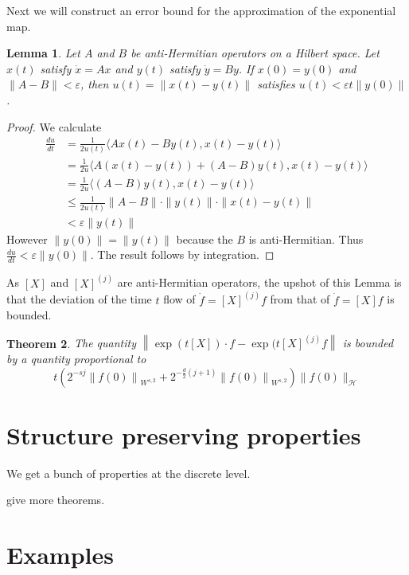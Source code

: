 \documentclass[12pt]{amsart}
\newcommand{\norm}[1]{\ensuremath{\left\| #1 \right\| }}
\newtheorem{thm}{Theorem}[section]
\newtheorem{lem}[thm]{Lemma}
\begin{document}
Next we will construct an error bound for the approximation of the exponential map.

\begin{lem}
Let $A$ and $B$ be anti-Hermitian operators on a Hilbert space.  Let $x(t)$ satisfy $\dot{x} = Ax$ and $y(t)$ satisfy $\dot{y} = By$.  If $x(0) = y(0)$ and $\| A - B \| < \varepsilon$, then $u(t) = \| x(t) - y(t) \|$ satisfies $u(t) < \varepsilon t  \| y(0) \|$.
\end{lem}

\begin{proof}
	We calculate
	\begin{align*}
		\frac{du}{dt} &= \frac{1}{2u(t)} \langle Ax(t) - By(t) , x(t) - y(t) \rangle \\
			&= \frac{1}{2u} \langle A(x(t)-y(t)) + (A-B) y(t) , x(t) - y(t) \rangle \\
			&= \frac{1}{2u} \langle (A-B)y(t) , x(t) - y(t) \rangle \\
			&\leq \frac{1}{2u(t)} \| A - B \| \cdot \| y(t) \| \cdot \| x(t) - y(t) \| \\
			&< \varepsilon \| y(t) \|
	\end{align*}
	However $\| y(0) \| = \| y(t)\|$ because the $B$ is anti-Hermitian.  Thus $\frac{du}{dt} < \varepsilon \| y(0)\|$.	The result follows by integration.
\end{proof}
As $[X]$ and $[X]^{(j)}$ are anti-Hermitian operators, the upshot of this Lemma is that the deviation of the time $t$ flow of $\dot{f} = [X]^{(j)} f$ from that of $\dot{f} = [X] f$ is bounded.
\begin{thm}
The quantity $\norm{ \exp(t [X]) \cdot f - \exp(t [X]^{(j)} f }$ is bounded by a quantity proportional to 
\[
 	t \left( 2^{-sj}\norm{f(0)}_{W^{s,2}} + 2^{-\frac{d}{2}(j+1)}\norm{f(0)}_{W^{s,2}} \right) \| f (0) \|_{\mathcal{H}}
\]
\end{thm}


\section{Structure preserving properties}
\label{sec:structure}
We get a bunch of properties at the discrete level.


give more theorems.

\section{Examples}
\end{document}
